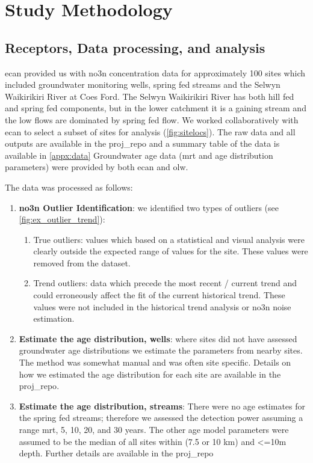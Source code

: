\section[Methods]{Study Methodology}   \label{sec:methods}
\subsection[Data]{Receptors, Data processing, and analysis} \label{sec:data}

\gls{ecan} provided us with \gls{no3n} concentration data for approximately 100 sites which included groundwater monitoring wells, spring fed streams and the Selwyn Waikirikiri River at Coes Ford. The Selwyn Waikirikiri River has both hill fed and spring fed components, but in the lower catchment it is a gaining stream and the low flows are dominated by spring fed flow. We worked collaboratively with \gls{ecan} to select a subset of sites for analysis (\autoref{fig:sitelocs}). The raw data and all outputs are available in the \gls{proj_repo} and a summary table of the data is available in \autoref{appx:data} Groundwater age data (\gls{mrt} and age distribution parameters) were provided by both \gls{ecan} and \gls{olw}.

The data was processed as follows:
\begin{enumerate}
    \item \textbf{\gls{no3n} Outlier Identification}: we identified two types of outliers (see \autoref{fig:ex_outlier_trend}):
    \begin{enumerate}
        \item  True outliers: values which based on a statistical and visual analysis were clearly outside the expected range of values for the site. These values were removed from the dataset.
        \item Trend outliers: data which precede the most recent / current trend and could erroneously affect the fit of the current historical trend. These values were not included in the historical trend analysis or \gls{no3n} noise estimation.
    \end{enumerate}
    \item \textbf{Estimate the age distribution, wells}: where sites did not have assessed groundwater age distributions we estimate the parameters from nearby sites. The method was somewhat manual and was often site specific. Details on how we estimated the age distribution for each site are available in the \gls{proj_repo}.
    \item \textbf{Estimate the age distribution, streams}: There were no age estimates for the spring fed streams; therefore we assessed the detection power assuming a range \gls{mrt}, 5, 10, 20, and 30 years. The other age model parameters were assumed to be the median of all sites within (7.5 or 10 km) and <=10m depth. Further details are available in the \gls{proj_repo}
\end{enumerate}

